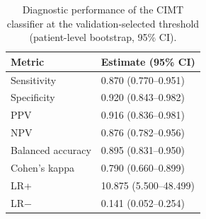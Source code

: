 \begin{table}
\caption{Diagnostic performance of the CIMT classifier at the validation-selected threshold (patient-level bootstrap, 95\% CI).}
\label{tab:diagnostic_metrics}
\begin{tabular}{ll}
\toprule
Metric & Estimate (95\% CI) \\
\midrule
Sensitivity & 0.870 (0.770–0.951) \\
Specificity & 0.920 (0.843–0.982) \\
PPV & 0.916 (0.836–0.981) \\
NPV & 0.876 (0.782–0.956) \\
Balanced accuracy & 0.895 (0.831–0.950) \\
Cohen's kappa & 0.790 (0.660–0.899) \\
LR+ & 10.875 (5.500–48.499) \\
LR− & 0.141 (0.052–0.254) \\
\bottomrule
\end{tabular}
\end{table}
